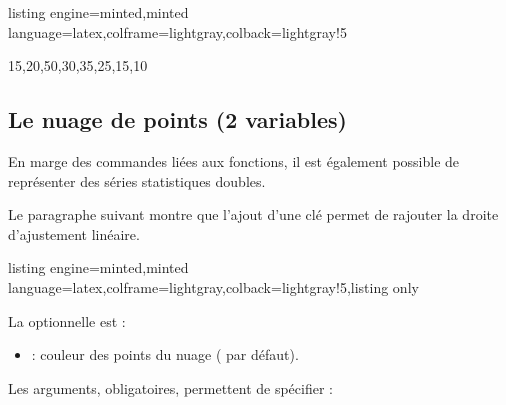 \documentclass[11pt,a4paper]{ltxdoc}
\begin{document}
\begin{tcblisting}{listing engine=minted,minted language=latex,colframe=lightgray,colback=lightgray!5}
\begin{GraphiqueTikz}[x=0.15cm,y=0.03cm,Xmin=0,Xmax=75,Xgrille=10,Xgrilles=5,
	Ymin=0,Ymax=200,Ygrille=20,Ygrilles=10]
		{15,20,50,30,35,25,15,10}
\end{GraphiqueTikz}

\end{tcblisting}

\subsection{Le nuage de points (2 variables)}\label{nuage}

En marge des commandes liées aux fonctions, il est également possible de représenter des séries statistiques doubles.

\smallskip

Le paragraphe suivant montre que l'ajout d'une clé permet de rajouter la droite d'ajustement linéaire.

\begin{tcblisting}{listing engine=minted,minted language=latex,colframe=lightgray,colback=lightgray!5,listing only}
\end{tcblisting}

La \MontreCode{[clé]} optionnelle est :

\smallskip

\begin{itemize}
	\item {} : couleur des points du nuage ( par défaut).
\end{itemize}

\smallskip

Les arguments, obligatoires, permettent de spécifier :
\end{document}
